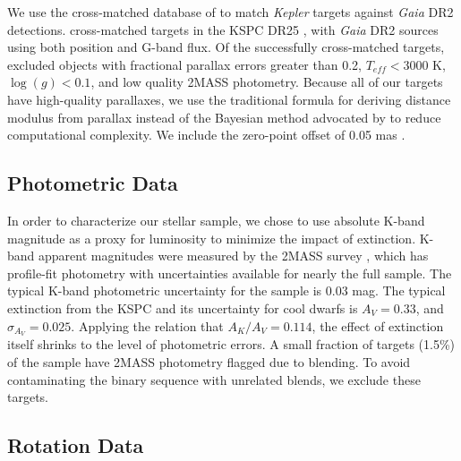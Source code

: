 \documentclass[manuscript]{aastex6}
\newcommand{\Kepler}{\mbox{\textit{Kepler}}}
\newcommand{\Gaia}{\mbox{\textit{Gaia}}}
\newcommand{\Teff}{\ensuremath{T_{eff}}}
\newcommand{\logg}{\ensuremath{\log(g)}}
\newcommand{\gvs}{\authorcomment1}
\begin{document}

We use the cross-matched database of \citet{Berger18b} to match \Kepler{} targets
against \Gaia{} DR2 detections.
\citet{Berger18b} cross-matched targets in the KSPC DR25 \citep{Mathur17}, 
with \Gaia{} DR2 sources using both position and G-band flux. Of the 
successfully cross-matched targets, \citet{Berger18b} excluded objects with 
fractional parallax errors greater than 0.2, \(\Teff < 3000\) K, 
\(\logg < 0.1\), and low quality 2MASS photometry.  Because all of our 
targets have high-quality parallaxes, we use the traditional 
formula for deriving distance modulus from parallax instead of the Bayesian 
method advocated by \citet{Luri18} to reduce computational complexity. We
include the zero-point offset of 0.05 mas \citep{Zinn18}.

\subsection{Photometric Data}

In order to characterize our stellar sample, we chose to use absolute K-band
magnitude as a proxy for luminosity to minimize the impact of extinction. 
K-band apparent magnitudes were measured by the 2MASS survey 
\citep{Skrutskie06}, which has profile-fit photometry with uncertainties 
available for nearly the full sample.  The 
typical K-band photometric uncertainty for the \citet{McQuillan14} sample is 
0.03 mag. The typical extinction from the KSPC and its uncertainty for cool 
dwarfs is \(A_V = 0.33\), and \(\sigma_{A_V}=0.025\). Applying the 
\citet{Cardelli89} relation that \(A_K/A_V = 0.114\), the effect of extinction 
itself shrinks to the level of photometric errors.  A small fraction of 
targets (1.5\%) of the \citet{McQuillan14} sample have 2MASS photometry 
flagged due to blending. To avoid contaminating the binary sequence with 
unrelated blends, we exclude these targets.

\subsection{Rotation Data}
\end{document}
